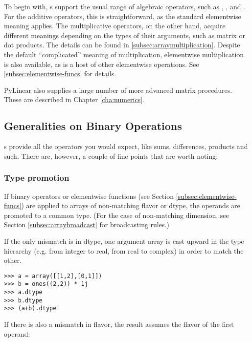 To begin with, s support the usual range of algebraic operators,
such as \code{+}, \code{-}, \code{*} and \code{/}. For the additive operators,
this is straightforward, as the standard elementwise meaning applies. The
multiplicative operators, on the other hand, acquire different meanings
depending on the types of their arguments, such as matrix or dot products.  The
details can be found in \ref{subsec:arraymultiplication}. Despite the default
``complicated'' meaning of multiplication, elementwise multiplication is
also available, as is a host of other elementwise operations. See 
\ref{subsec:elementwise-funcs} for details.

PyLinear also supplies a large number of more advanced matrix procedures.
These are described in Chapter \ref{cha:numerics}.
\subsection{Generalities on Binary Operations}
s provide all the operators you would expect, like sums,
differences, products and such. There are, however, a couple of fine points
that are worth noting:
\subsubsection{Type promotion}
\label{sssec:arraypromotion}
If binary operators or elementwise functions (see Section
\ref{subsec:elementwise-funcs}) are applied to arrays of non-matching flavor or
dtype, the operands are promoted to a common type. (For the case of
non-matching dimension, see Section \ref{subsec:arraybroadcast} for
broadcasting rules.)

If the only mismatch is in dtype, one argument array
is cast upward in the type hierarchy (e.g. from integer to real,
from real to complex) in order to match the other.

\begin{verbatim}
>>> a = array([[1,2],[0,1]])
>>> b = ones((2,2)) * 1j
>>> a.dtype
>>> b.dtype
>>> (a+b).dtype
\end{verbatim}

If there is also a mismatch in flavor, the result assumes the flavor
of the first operand:

